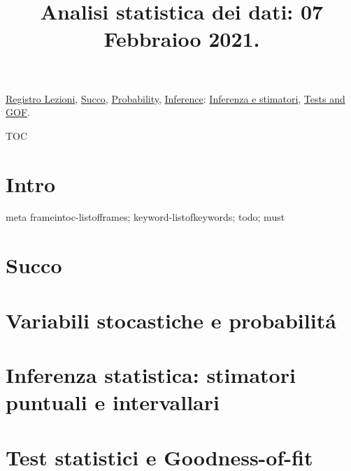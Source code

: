 \documentclass[t,10pt,xcolor={usenames},fleqn]{beamer}
\title{Analisi statistica dei dati: 07 Febbraioo 2021.}
\begin{document}
\setcounter{tocdepth}{2}

\begin{frame}
  \titlepage
  \hyperlink{reg}{Registro Lezioni}, \hyperlink{succo}{Succo}, \hyperlink{statdistro}{Probability}, \hyperlink{inference}{Inference}: \hyperlink{inferenceparadigm}{Inferenza e stimatori}, \hyperlink{testgof}{Tests and GOF}.
\end{frame}

\begin{frame}{TOC}
\tableofcontents[onlyparts]
\listofframes
\end{frame}

\part{Intro}
\begin{frame}{meta}
frameintoc-listofframes; keyword-listofkeywords; todo; must
\end{frame}

%

\part{Succo}
%

\part{Variabili stocastiche e probabilit\'a}
%

\part{Inferenza statistica: stimatori puntuali e intervallari}
%
\part{Test statistici e Goodness-of-fit}
%
\end{document}
